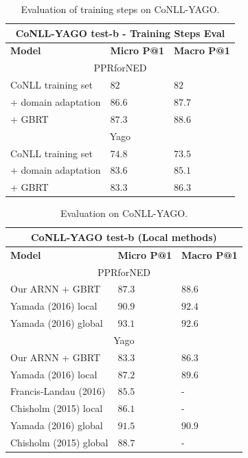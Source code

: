\documentclass[11pt,a4paper]{article}
\begin{document}
	\begin{table}[ht]
		\begin{center}
			\begin{tabular}{|p{3.5cm}| p{1.3cm} p{1.3cm}|}
				\hline \multicolumn{3}{|c|}{CoNLL-YAGO test-b - Training Steps Eval} \\
				\hline \textbf{Model} & \textbf{Micro P@1} & \textbf{Macro P@1} \\ 
				\hline \multicolumn{3}{|c|}{PPRforNED} \\
				\hline CoNLL training set    & $82$  & $82$ \\
				+ domain adaptation    & $86.6$  & $87.7$ \\
				+ GBRT    & $87.3$  & $88.6$ \\
				\hline \multicolumn{3}{|c|}{Yago} \\
				\hline CoNLL training set    & $74.8$  & $73.5$ \\
				+ domain adaptation    & $83.6$  & $85.1$ \\
				+ GBRT    & $83.3$  & $86.3$ \\
				\hline
			\end{tabular}
		\end{center}
		\caption{\label{tab:training} Evaluation of training steps on CoNLL-YAGO.}
	\end{table}
	
	\begin{table}[ht]
		\begin{center}
			\begin{tabular}{|p{3.7cm}| p{1.2cm} p{1.2cm}|}
				\hline \multicolumn{3}{|c|}{CoNLL-YAGO test-b (Local methods)} \\
				\hline \textbf{Model} & \textbf{Micro P@1} & \textbf{Macro P@1} \\ 
				\hline \multicolumn{3}{|c|}{PPRforNED} \\
				\hline Our ARNN + GBRT    & $87.3$  & $88.6$ \\
				Yamada (2016) local               & $90.9$  & $92.4$ \\
				\hline Yamada (2016) global               & $93.1$  & $92.6$ \\
				\hline \multicolumn{3}{|c|}{Yago} \\
				\hline Our ARNN + GBRT    & $83.3$  & $86.3$ \\
				Yamada (2016) local               & $87.2$  & $89.6$ \\
				Francis-Landau (2016)             & $85.5$  & - \\
				Chisholm (2015) local             & $86.1$  & - \\
				\hline Yamada (2016) global               & $91.5$  & $90.9$ \\
				Chisholm (2015) global             & $88.7$  & - \\
				\hline
			\end{tabular}
		\end{center}
		\caption{\label{tab:conll} Evaluation on CoNLL-YAGO.}
	\end{table}
	
\end{document}
